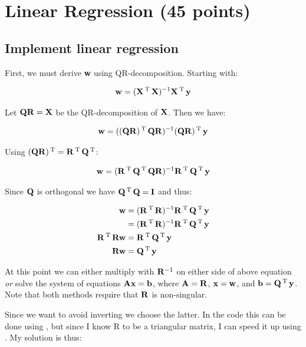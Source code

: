 \newpage
\section{Linear Regression (45 points)}

\subsection{Implement linear regression}
First, we must derive \textbf{w} using QR-decomposition. Starting with:

\begin{align*}
  \mbf{w} &= (\mbf X\T \mbf X)^{-1} \mbf X\T \mbf y\\
\end{align*}

Let $\mbf{QR} = \mbf X$ be the QR-decomposition of $\mbf X$. Then we have:

\begin{align*}
  \mbf{w} &= ((\mbf{QR})\T  \mbf{QR})^{-1} (\mbf{QR})\T \mbf y\\
\end{align*}

Using $(\mbf{QR})\T = \mbf R\T \mbf Q\T$:

\begin{align*}
  \mbf{w} &= (\mbf R\T\mbf Q\T \mbf{QR})^{-1} \mbf R\T\mbf Q\T \mbf y \\
\end{align*}

Since $\mbf Q$ is orthogonal we have $\mbf Q\T \mbf Q = \mbf I$ and thus:

\begin{align*}
  \mbf{w} &= (\mbf R\T\mbf R)^{-1} \mbf R\T\mbf Q\T \mbf y \\
          &= (\mbf R\T\mbf R)^{-1} \mbf R\T\mbf Q\T \mbf y \\
  \mbf R\T\mbf R\mbf{w} &=  \mbf R\T\mbf Q\T \mbf y \\
  \mbf R\mbf{w} &= \mbf Q\T \mbf y \\
\end{align*}

At this point we can either multiply with $\mbf R^{-1}$ on either side of above
equation \textit{or} solve the system of equations $\mbf A \mbf x = \mbf b$,
where $\mbf A = \mbf R$, $\mbf x = \mbf w$, and $\mbf b = \mbf Q\T \mbf y$. Note
that both methods require that $\mbf R$ is non-singular.

Since we want to avoid inverting we choose the latter. In the code this can be
done using , but since I know \ms R to be a triangular
matrix, I can speed it up using . My solution
is thus:

